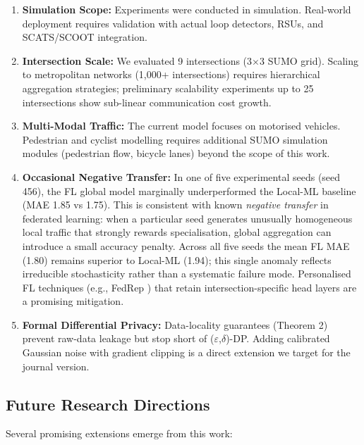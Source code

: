 \documentclass[conference]{IEEEtran}
\begin{document}
\begin{enumerate}
    \item \textbf{Simulation Scope:} Experiments were conducted in simulation. Real-world deployment requires validation with actual loop detectors, RSUs, and SCATS/SCOOT integration.

    \item \textbf{Intersection Scale:} We evaluated 9 intersections (3$\times$3 SUMO grid). Scaling to metropolitan networks (1,000+ intersections) requires hierarchical aggregation strategies; preliminary scalability experiments up to 25 intersections show sub-linear communication cost growth.

    \item \textbf{Multi-Modal Traffic:} The current model focuses on motorised vehicles. Pedestrian and cyclist modelling requires additional SUMO simulation modules (pedestrian flow, bicycle lanes) beyond the scope of this work.

    \item \textbf{Occasional Negative Transfer:} In one of five experimental seeds (seed 456), the FL global model marginally underperformed the Local-ML baseline (MAE 1.85 vs 1.75). This is consistent with known \emph{negative transfer} in federated learning: when a particular seed generates unusually homogeneous local traffic that strongly rewards specialisation, global aggregation can introduce a small accuracy penalty. Across all five seeds the mean FL MAE (1.80) remains superior to Local-ML (1.94); this single anomaly reflects irreducible stochasticity rather than a systematic failure mode. Personalised FL techniques (e.g., FedRep \cite{li2020fedprox}) that retain intersection-specific head layers are a promising mitigation.

    \item \textbf{Formal Differential Privacy:} Data-locality guarantees (Theorem 2) prevent raw-data leakage but stop short of ($\varepsilon$,$\delta$)-DP. Adding calibrated Gaussian noise with gradient clipping is a direct extension we target for the journal version.
\end{enumerate}

\subsection{Future Research Directions}
Several promising extensions emerge from this work:
\end{document}
